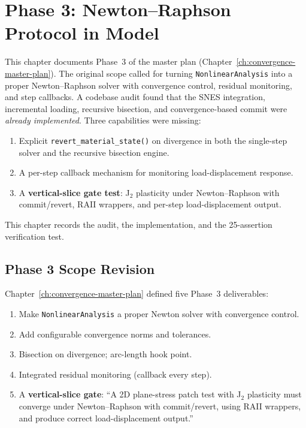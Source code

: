 
\chapter{Phase 3: Newton--Raphson Protocol in Model}
\label{ch:phase3-newton-raphson}

This chapter documents Phase~3 of the master plan
(Chapter~\ref{ch:convergence-master-plan}).
The original scope called for turning \texttt{NonlinearAnalysis} into a
proper Newton--Raphson solver with convergence control, residual
monitoring, and step callbacks.
A codebase audit found that the SNES integration, incremental loading,
recursive bisection, and convergence-based commit were
\emph{already implemented}.
Three capabilities were missing:

\begin{enumerate}
  \item Explicit \texttt{revert\_material\_state()} on divergence in both
        the single-step solver and the recursive bisection engine.
  \item A per-step callback mechanism for monitoring load-displacement
        response.
  \item A \textbf{vertical-slice gate test}: J$_2$ plasticity under
        Newton--Raphson with commit/revert, RAII wrappers, and per-step
        load-displacement output.
\end{enumerate}

This chapter records the audit, the implementation, and the 25-assertion
verification test.


\section{Phase 3 Scope Revision}
\label{sec:phase3-scope-revision}

Chapter~\ref{ch:convergence-master-plan} defined five Phase~3
deliverables:

\begin{enumerate}
  \item Make \texttt{NonlinearAnalysis} a proper Newton solver with
        convergence control.
  \item Add configurable convergence norms and tolerances.
  \item Bisection on divergence; arc-length hook point.
  \item Integrated residual monitoring (callback every step).
  \item A \textbf{vertical-slice gate}: ``A 2D plane-stress patch test
        with J$_2$ plasticity must converge under Newton--Raphson with
        commit/revert, using RAII wrappers, and produce correct
        load-displacement output.''
\end{enumerate}

